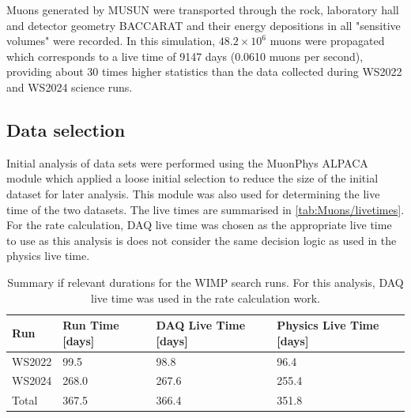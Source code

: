 Muons generated by MUSUN were transported through the rock, laboratory hall and detector geometry BACCARAT and their energy depositions in all "sensitive volumes" were recorded. In this simulation, $48.2\times10^6$ muons were propagated which corresponds to a live time of 9147 days (0.0610 muons per second), providing about 30 times higher statistics than the data collected during WS2022 and WS2024 science runs.

\subsection{Data selection}\label{sec:Muons/MuonFluxDataSelection}
Initial analysis of data sets were performed using the {\selectfont MuonPhys} ALPACA module which applied a loose initial selection to reduce the size of the initial dataset for later analysis. This module was also used for determining the live time of the two datasets. The live times are summarised in \autoref{tab:Muons/livetimes}. For the rate calculation, DAQ live time was chosen as the appropriate live time to use as this analysis is does not consider the same decision logic as used in the physics live time.
\begin{table}[ht!]
    \centering
    \caption{Summary if relevant durations for the WIMP search runs. For this analysis, DAQ live time was used in the rate calculation work.}
    \label{tab:Muons/livetimes}
    \begin{tabular}{llll}
        \hline\hline
        \textbf{Run} & \textbf{Run Time [days]} & \textbf{DAQ Live Time [days]} & \textbf{Physics Live Time [days]} \\
        \hline
        WS2022 & 99.5 & 98.8 & 96.4 \\
        WS2024 & 268.0 & 267.6 & 255.4 \\
        Total & 367.5 & 366.4 & 351.8 \\
        \hline\hline
    \end{tabular}
\end{table}
